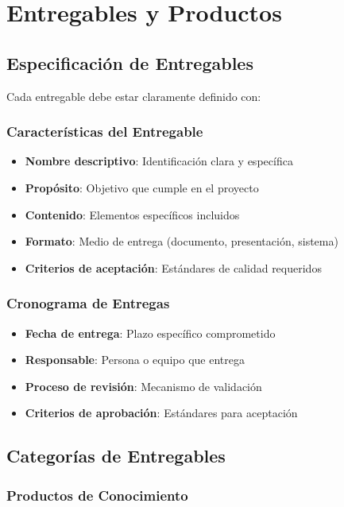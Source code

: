 \documentclass[12pt,letterpaper,oneside]{book}
\begin{document}
\section{Entregables y Productos}

\subsection{Especificación de Entregables}

Cada entregable debe estar claramente definido con:

\subsubsection{Características del Entregable}

\begin{itemize}
\item \textbf{Nombre descriptivo}: Identificación clara y específica
\item \textbf{Propósito}: Objetivo que cumple en el proyecto
\item \textbf{Contenido}: Elementos específicos incluidos
\item \textbf{Formato}: Medio de entrega (documento, presentación, sistema)
\item \textbf{Criterios de aceptación}: Estándares de calidad requeridos
\end{itemize}

\subsubsection{Cronograma de Entregas}

\begin{itemize}
\item \textbf{Fecha de entrega}: Plazo específico comprometido
\item \textbf{Responsable}: Persona o equipo que entrega
\item \textbf{Proceso de revisión}: Mecanismo de validación
\item \textbf{Criterios de aprobación}: Estándares para aceptación
\end{itemize}

\subsection{Categorías de Entregables}

\subsubsection{Productos de Conocimiento}
\end{document}
